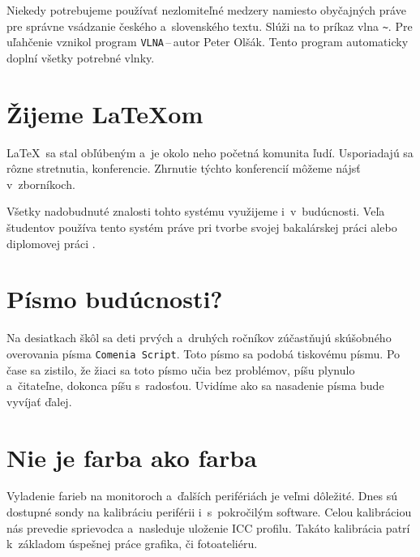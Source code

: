 \documentclass[a4paper,11pt]{article}
\begin{document}
Niekedy potrebujeme používať nezlomiteľné medzery namiesto obyčajných práve pre správne vsádzanie českého a~slovenského textu.
Slúži na to príkaz vlna \verb|~|. Pre uľahčenie vznikol program \texttt{VLNA}\,--\,autor Peter Olšák. Tento program automaticky doplní všetky potrebné vlnky.\cite{VLNA}

\section{Žijeme \LaTeX om}
\LaTeX \ sa stal obľúbeným a~je okolo neho početná komunita ľudí. Usporiadajú sa rôzne stretnutia, konferencie. Zhrnutie týchto konferencií môžeme nájsť v~zborníkoch. \cite{ZBORNIK}

Všetky nadobudnuté znalosti tohto systému využijeme i~v~budúcnosti. Veľa študentov používa tento systém práve pri tvorbe svojej bakalárskej práci \cite{Hamrsky:bak:RozoznavaniePisma} alebo diplomovej práci \cite{Cerny:diplom:Latex-MSPP}.

\section{Písmo budúcnosti?}
Na desiatkach škôl sa deti prvých a~druhých ročníkov zúčastňujú skúšobného overovania písma \texttt{Comenia Script}. Toto písmo sa podobá tiskovému písmu. Po čase sa zistilo, že žiaci sa toto písmo učia bez problémov, píšu plynulo a~čitateľne, dokonca píšu s~radosťou.
Uvidíme ako sa nasadenie písma bude vyvíjať ďalej.\cite{PISMO}

\section{Nie je farba ako farba}
Vyladenie farieb na monitoroch a~ďalších perifériách je veľmi dôležité. Dnes sú dostupné sondy na kalibráciu periférii i~s~pokročilým software. Celou kalibráciou nás prevedie sprievodca a~nasleduje uloženie ICC profilu. Takáto kalibrácia patrí k~základom úspešnej práce grafika, či fotoateliéru.\cite{FONT}


\newpage

\end{document}
